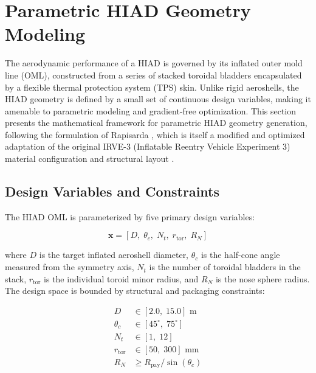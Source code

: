 \section{Parametric HIAD Geometry Modeling}

The aerodynamic performance of a HIAD is governed by its inflated outer mold line (OML), constructed from a series of stacked toroidal bladders encapsulated by a flexible thermal protection system (TPS) skin. Unlike rigid aeroshells, the HIAD geometry is defined by a small set of continuous design variables, making it amenable to parametric modeling and gradient-free optimization. This section presents the mathematical framework for parametric HIAD geometry generation, following the formulation of Rapisarda \cite{rapisarda2023mdao}, which is itself a modified and optimized adaptation of the original IRVE-3 (Inflatable Reentry Vehicle Experiment 3) material configuration and structural layout \cite{dillman2015irve3, old2013irve3postflight}.

\subsection{Design Variables and Constraints}

The HIAD OML is parameterized by five primary design variables:

\begin{equation}
    \mathbf{x} = \left[ D,\; \theta_c,\; N_t,\; r_{\text{tor}},\; R_N \right]
    \label{eq:hiad_design_variables}
\end{equation}

\noindent where $D$ is the target inflated aeroshell diameter, $\theta_c$ is the half-cone angle measured from the symmetry axis, $N_t$ is the number of toroidal bladders in the stack, $r_{\text{tor}}$ is the individual toroid minor radius, and $R_N$ is the nose sphere radius. The design space is bounded by structural and packaging constraints:

\begin{equation}
    \begin{aligned}
        D &\in [2.0,\; 15.0] \text{ m} \\
        \theta_c &\in [45^\circ,\; 75^\circ] \\
        N_t &\in [1,\; 12] \\
        r_{\text{tor}} &\in [50,\; 300] \text{ mm} \\
        R_N &\geq R_{\text{pay}} / \sin(\theta_c)
    \end{aligned}
    \label{eq:design_bounds}
\end{equation}

